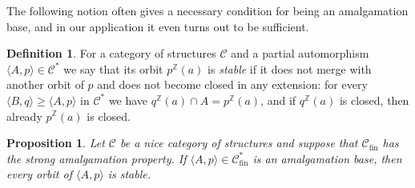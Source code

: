 \documentclass[10pt,a4paper]{article}
\newtheorem{prop}[tw]{Proposition}
\theoremstyle{definition}
\newtheorem{df}[tw]{Definition}
\theoremstyle{remark}
\newcommand \seq [1]{\langle #1 \rangle}
\newcommand \Z {\mathbb{Z}}
\newcommand \C {\mathscr{C}}
\newcommand \fin {{\operatorname{fin}}}
\begin{document}
The following notion often gives a necessary condition for being an amalgamation base, and in our application it even turns out to be sufficient.

\begin{df}
For a category of structures $\C$ and a partial automorphism $\seq{A, p} \in \C^*$ we say that its orbit $p^\Z(a)$ is \emph{stable} if it does not merge with another orbit of $p$ and does not become closed in any extension:
for every $\seq{B, q} \geq \seq{A, p}$ in $\C^*$ we have $q^\Z(a) \cap A = p^\Z(a)$, and if $q^\Z(a)$ is closed, then already $p^\Z(a)$ is closed.
\end{df}

\begin{prop} \label{thm:stable_necessary}
    Let $\C$ be a nice category of structures and suppose that $\C_\fin$ has the strong amalgamation property.
    If $\seq{A, p} \in \C^*_\fin$ is an amalgamation base, then every orbit of $\seq{A, p}$ is stable.
\end{prop}
\end{document}
